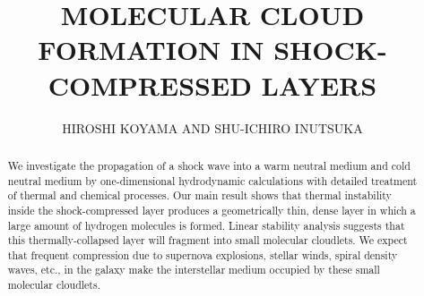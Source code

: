 


\textheight=240mm




\title{MOLECULAR CLOUD FORMATION IN SHOCK-COMPRESSED LAYERS
}

\author{HIROSHI KOYAMA AND SHU-ICHIRO INUTSUKA}







\begin{abstract}
We investigate the propagation of a shock wave
into a warm neutral medium and cold neutral medium 
by one-dimensional hydrodynamic calculations
with detailed treatment of thermal and chemical processes.
Our main result shows that 
thermal instability inside the shock-compressed layer produces  
a geometrically thin, dense layer in which
a large amount of hydrogen molecules is formed.
Linear stability analysis suggests
that this thermally-collapsed layer will fragment
into small molecular cloudlets.
We expect that frequent compression due to supernova explosions,
stellar winds, spiral density waves, etc., in the galaxy 
make the interstellar medium occupied by these small molecular cloudlets.
\end{abstract}


